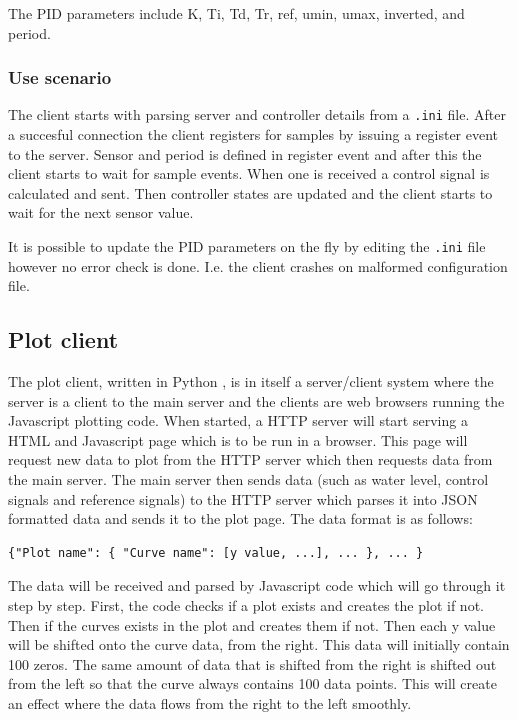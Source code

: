 \documentclass{article}
\begin{document}
The PID parameters include K, Ti, Td, Tr, ref, umin, umax, inverted, and period.

\subsubsection{Use scenario}
The client starts with parsing server and controller details from a
\verb+.ini+ file. After a succesful connection the client registers for
samples by issuing a register event to the server. Sensor and period
is defined in register event and after this the client starts to wait
for sample events. When one is received a control signal is calculated
and sent. Then controller states are updated and the client starts to
wait for the next sensor value.

It is possible to update the PID parameters on the fly by editing the 
\verb+.ini+ file however no error check is done. I.e. the client crashes
on malformed configuration file.


\subsection{Plot client}
The plot client, written in Python \cite{python}, is in itself a server/client
system where the server is a client to the main server and the clients are web
browsers running the Javascript plotting code. When started, a HTTP server will
start serving a HTML and Javascript page which is to be run in a browser. This
page will request new data to plot from the HTTP server which then requests data
from the main server. The main server then sends data (such as water level,
control signals and reference signals) to the HTTP server which parses it into
JSON \cite{json} formatted data and sends it to the plot page. The data format is
as follows:
\begin{verbatim}
{"Plot name": { "Curve name": [y value, ...], ... }, ... }
\end{verbatim}
The data will be received and parsed by Javascript code which will go through it
step by step. First, the code checks if a plot exists and creates the plot if
not. Then if the curves exists in the plot and creates them if not. Then each y
value will be shifted onto the curve data, from the right. This data will
initially contain 100 zeros. The same amount of data that is shifted from the
right is shifted out from the left so that the curve always contains 100
data points. This will create an effect where the data flows from the right to
the left smoothly.
\end{document}
